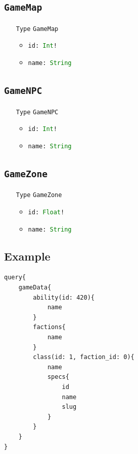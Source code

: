 \documentclass[10pt, a4paper]{memoir}
\numberwithin{equation}{section}
\theoremstyle{plain}
\theoremstyle{defp}
\theoremstyle{dotless}
\theoremstyle{definition}
\theoremstyle{dotless}
\theoremstyle{dotless}
\theoremstyle{defp}
\theoremstyle{defp}
\theoremstyle{be}          %
\theoremstyle{defp}
\newcommand\ttt[1]{\texttt{#1}}
\newcommand\type[1]{\ttt{\textcolor{green}{#1}}}
\begin{document}
\subsection{\ttt{GameMap}}\label{sec:GameMap}

\begin{itemize}[noitemsep,topsep=1pt]
\item[\ttt{Type}] \ttt{GameMap}
\begin{itemize}[itemsep=1pt,topsep=1pt]
\item \ttt{id: \type{Int}!}
\item \ttt{name: \type{String}}
\end{itemize}
\end{itemize}

\subsection{\ttt{GameNPC}}\label{sec:GameNPC}

\begin{itemize}[noitemsep,topsep=1pt]
\item[\ttt{Type}] \ttt{GameNPC}
\begin{itemize}[itemsep=1pt,topsep=1pt]
\item \ttt{id: \type{Int}!}
\item \ttt{name: \type{String}}
\end{itemize}
\end{itemize}

\subsection{\ttt{GameZone}}\label{sec:GameZone}

\begin{itemize}[noitemsep,topsep=1pt]
\item[\ttt{Type}] \ttt{GameZone}
\begin{itemize}[itemsep=1pt,topsep=1pt]
\item \ttt{id: \type{Float}!}
\item \ttt{name: \type{String}}
\end{itemize}
\end{itemize}

\subsection{Example}

\begin{lstlisting}[language=WowAPI]
query{
	gameData{
		ability(id: 420){
			name
		}
		factions{
			name
		}
		class(id: 1, faction_id: 0){
			name
			specs{
				id
				name
				slug
			}
		}
	}
}
\end{lstlisting}
\end{document}
